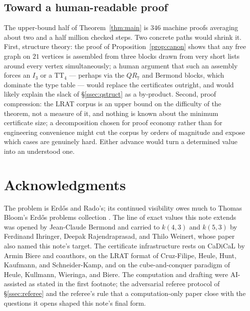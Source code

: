 \documentclass[11pt]{amsart}
\newcommand{\TT}[1]{\mathrm{TT}_{#1}}
\newcommand{\I}[1]{I_{#1}}
\theoremstyle{plain}
\theoremstyle{definition}
\theoremstyle{remark}
\begin{document}
\subsection{Toward a human-readable proof}\label{ssec:qhuman}
The upper-bound half of Theorem~\ref{thm:main} is $346$ machine proofs
averaging about two and a half million checked steps. Two concrete paths would shrink
it. First, structure theory: the proof
of Proposition~\ref{prop:canon} shows that any free graph on $21$
vertices is assembled from three blocks drawn from very short lists
around every vertex simultaneously; a human argument that such an
assembly forces an $\I3$ or a $\TT{4}$ --- perhaps via the $QR_7$ and
Bermond blocks, which dominate the type table --- would replace the
certificates outright, and would likely explain the slack of
\S\ref{ssec:qstruct} as a by-product. Second, proof compression: the
LRAT corpus is an upper bound on the difficulty of the theorem, not a
measure of it, and nothing is known about the minimum certificate size;
a decomposition chosen for proof economy rather than for engineering
convenience might cut the corpus by orders of magnitude and expose
which cases are genuinely hard. Either advance would turn a determined
value into an understood one.

\section*{Acknowledgments}

The problem is Erd\H{o}s and Rado's; its continued visibility owes much
to Thomas Bloom's Erd\H{o}s problems collection \cite{Blo}. The line of
exact values this note extends was opened by Jean-Claude Bermond and
carried to $k(4,3)$ and $k(5,3)$ by Ferdinand Ihringer, Deepak
Rajendraprasad, and Thilo Weinert, whose paper also named this note's
target. The certificate infrastructure rests on CaDiCaL by Armin Biere
and coauthors, on the LRAT format of Cruz-Filipe, Heule, Hunt, Kaufmann,
and Schneider-Kamp, and on the cube-and-conquer paradigm of Heule,
Kullmann, Wieringa, and Biere. The computation and drafting were
AI-assisted as stated in the first footnote; the adversarial referee
protocol of \S\ref{ssec:referee} and the referee's rule that a
computation-only paper close with the questions it opens shaped this
note's final form.
\end{document}
